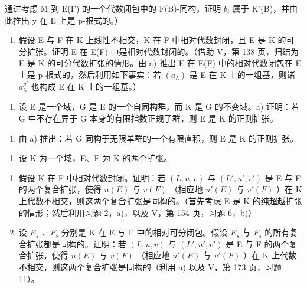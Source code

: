 通过考虑 M 到 E(F) 的一个代数闭包中的 F(B)-同构，证明 \(b_{i}\) 属于 K'(B)，并由此推出 y 在 E 上是 p-根式的。）

\begin{enumerate}
\def\labelenumi{\alph{enumi})}
\setcounter{enumi}{1}
\tightlist
\item
  假设 E 与 F 在 K 上线性不相交，K 在 F 中相对代数封闭，且 E 是 K 的可分扩张。证明 E 在 E(F) 中是相对代数封闭的。（借助 V，第 138 页，归结为 E 是 K 的可分代数扩张的情形。由 a) 推出 E 在 E(F) 中的相对代数闭包在 E 上是 p-根式的，然后利用如下事实：若 \((a_{\lambda})\) 是 E 在 K 上的一组基，则诸 \(a_{\lambda}^{p'}\) 也构成 E 在 K 上的一组基。）
\end{enumerate}

\begin{enumerate}
\def\labelenumi{\arabic{enumi})}
\setcounter{enumi}{2}
\tightlist
\item
  设 E 是一个域，G 是 E 的一个自同构群，而 K 是 G 的不变域。a) 证明：若 G 中不存在异于 G 本身的有限指数正规子群，则 E 是 K 的正则扩张。
\end{enumerate}

\begin{enumerate}
\def\labelenumi{\alph{enumi})}
\setcounter{enumi}{1}
\tightlist
\item
  由 a) 推出：若 G 同构于无限单群的一个有限直积，则 E 是 K 的正则扩张。
\end{enumerate}

\begin{enumerate}
\def\labelenumi{\arabic{enumi})}
\setcounter{enumi}{3}
\tightlist
\item
  设 K 为一个域，E、F 为 K 的两个扩张。
\end{enumerate}

\begin{enumerate}
\def\labelenumi{\alph{enumi})}
\item
  假设 K 在 F 中相对代数封闭。证明：若 \((L, u, v)\) 与 \((L', u', v')\) 是 E 与 F 的两个复合扩张，使得 \(u(E)\) 与 \(v(F)\) （相应地 \(u'(E)\) 与 \(v'(F)\) ）在 K 上代数不相交，则这两个复合扩张是同构的。（首先考虑 E 是 K 的纯超越扩张的情形；然后利用习题 2，a)，以及 V，第 154 页，习题 6，b)）
\item
  设 \(E_{s}\) 、\(F_{s}\) 分别是 K 在 E 与 F 中的相对可分闭包。假设 \(E_{s}\) 与 \(F_{s}\) 的所有复合扩张都是同构的。证明：若 \((L, u, v)\) 与 \((L', u', v')\) 是 E 与 F 的两个复合扩张，使得 \(u(E)\) 与 \(v(F)\) （相应地 \(u'(E)\) 与 \(v'(F)\) ）在 K 上代数不相交，则这两个复合扩张是同构的（利用 a) 以及 V，第 173 页，习题 11）。
\end{enumerate}

